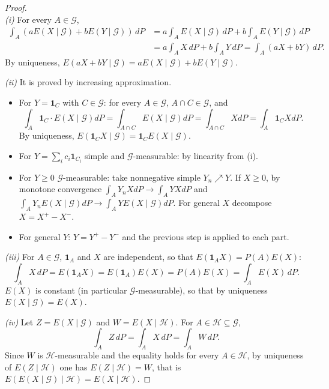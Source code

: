 \documentclass[11pt, a4paper]{article}
\begin{document}
\begin{proof}\leavevmode\\
\textit{(i)} For every $A \in \mathcal{G}$,
\begin{align*}
\int_A (aE(X \mid \mathcal{G}) + b E(Y \mid \mathcal{G})) \, dP
&= a \int_A E(X \mid \mathcal{G}) \, dP + b \int_A E(Y \mid \mathcal{G}) \, dP \\
&= a \int_A X \, dP + b \int_A Y \, dP = \int_A (aX + bY) \, dP.
\end{align*}
By uniqueness, $E(aX + bY \mid \mathcal{G}) = a E(X \mid \mathcal{G}) + b E(Y \mid \mathcal{G})$.

\textit{(ii)} It is proved by increasing approximation.
\begin{itemize}
    \item For $Y = \mathbf{1}_C$ with $C \in \mathcal{G}$: for every $A \in \mathcal{G}$,
    $A \cap C \in \mathcal{G}$, and
    $$ \int_A \mathbf{1}_C \cdot E(X \mid \mathcal{G}) dP = \int_{A \cap C} E(X \mid \mathcal{G}) dP
    = \int_{A \cap C} X dP = \int_A \mathbf{1}_C X dP. $$
    By uniqueness, $E(\mathbf{1}_C X \mid \mathcal{G}) = \mathbf{1}_C E(X \mid \mathcal{G})$.

    \item For $Y = \sum_i c_i \mathbf{1}_{C_i}$ simple and $\mathcal{G}$-measurable: by linearity from
    (i).

    \item For $Y \ge 0$ $\mathcal{G}$-measurable: take nonnegative simple $Y_n \nearrow Y$. If
    $X \ge 0$, by monotone convergence $\int_A Y_n X dP \to \int_A YX dP$ and $\int_A Y_n
    E(X \mid \mathcal{G}) dP \to \int_A Y E(X \mid \mathcal{G}) dP$. For general $X$ decompose
    $X = X^+ - X^-$.

    \item For general $Y$: $Y = Y^+ - Y^-$ and the previous step is applied to each part.
\end{itemize}

\textit{(iii)} For $A \in \mathcal{G}$, $\mathbf{1}_A$ and $X$ are independent,
so that $E(\mathbf{1}_A X) = P(A) E(X)$:
$$ \int_A X \, dP = E(\mathbf{1}_A X) = E(\mathbf{1}_A) E(X) = P(A) E(X) = \int_A E(X) \, dP. $$
$E(X)$ is constant (in particular $\mathcal{G}$-measurable), so that by uniqueness
$E(X \mid \mathcal{G}) = E(X)$.

\textit{(iv)} Let $Z = E(X \mid \mathcal{G})$ and $W = E(X \mid \mathcal{H})$. For
$A \in \mathcal{H} \subseteq \mathcal{G}$,
$$ \int_A Z \, dP = \int_A X \, dP = \int_A W \, dP. $$
Since $W$ is $\mathcal{H}$-measurable and the equality holds for every $A \in \mathcal{H}$, by uniqueness of
$E(Z \mid \mathcal{H})$ one has $E(Z \mid \mathcal{H}) = W$, that is $E(E(X \mid \mathcal{G})
\mid \mathcal{H}) = E(X \mid \mathcal{H})$.
\end{proof}
\end{document}
